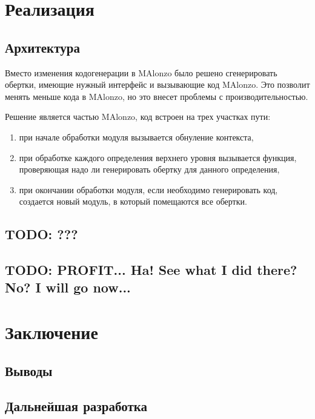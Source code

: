 \newpage
\section{Реализация}

\subsection{Архитектура}

Вместо изменения кодогенерации в MAlonzo было решено сгенерировать
обертки, имеющие нужный интерфейс и вызывающие код MAlonzo. Это
позволит менять меньше кода в MAlonzo, но это внесет проблемы с производительностью.

Решение является частью MAlonzo, код встроен на трех участках пути:
\begin{enumerate}
\item при начале обработки модуля вызывается обнуление контекста,
\item при обработке каждого определения верхнего уровня вызывается
      функция, проверяющая надо ли генерировать обертку для данного определения,
\item при окончании обработки модуля, если необходимо генерировать код, создается
      новый модуль, в который помещаются все обертки.
\end{enumerate}

\subsection{TODO: ???}

\subsection{TODO: PROFIT... Ha! See what I did there? No? I will go now...}

\newpage
\section{Заключение}

\subsection{Выводы}

\subsection{Дальнейшая разработка}
